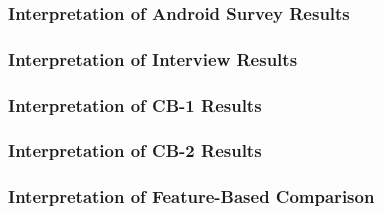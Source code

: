 \subsubsection{Interpretation of Android Survey Results}
\label{section:6.3.1}


\subsubsection{Interpretation of Interview Results}
\label{section:6.3.2}


\subsubsection{Interpretation of CB-1 Results}
\label{section:6.3.3}


\subsubsection{Interpretation of CB-2 Results}
\label{section:6.3.4}


\subsubsection{Interpretation of Feature-Based Comparison}
\label{section:6.3.5}
